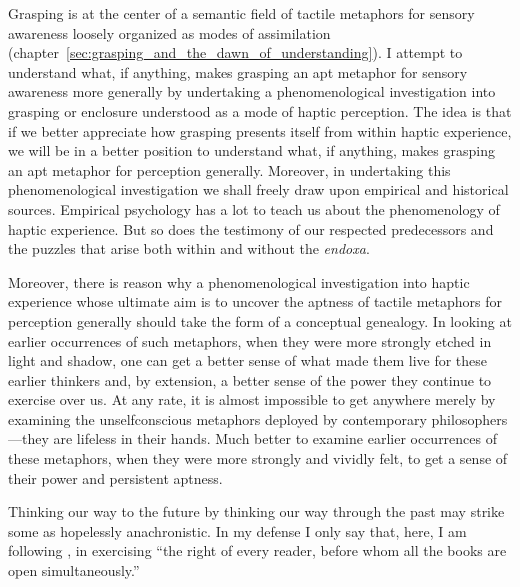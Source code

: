 Grasping is at the center of a semantic field of tactile metaphors for sensory awareness loosely organized as modes of assimilation (chapter~\ref{sec:grasping_and_the_dawn_of_understanding}). I attempt to understand what, if anything, makes grasping an apt metaphor for sensory awareness more generally by undertaking a phenomenological investigation into grasping or enclosure understood as a mode of haptic perception. The idea is that if we better appreciate how grasping presents itself from within haptic experience, we will be in a better position to understand what, if anything, makes grasping an apt metaphor for perception generally. Moreover, in undertaking this phenomenological investigation we shall freely draw upon empirical and historical sources. Empirical psychology has a lot to teach us about the phenomenology of haptic experience. But so does the testimony of our respected predecessors and the puzzles that arise both within and without the \emph{endoxa}.

Moreover, there is reason why a phenomenological investigation into haptic experience whose ultimate aim is to uncover the aptness of tactile metaphors for perception generally should take the form of a conceptual genealogy. In looking at earlier occurrences of such metaphors, when they were more strongly etched in light and shadow, one can get a better sense of what made them live for these earlier thinkers and, by extension, a better sense of the power they continue to exercise over us. At any rate, it is almost impossible to get anywhere merely by examining the unselfconscious metaphors deployed by contemporary philosophers---they are lifeless in their hands. Much better to examine earlier occurrences of these metaphors, when they were more strongly and vividly felt, to get a sense of their power and persistent aptness.

Thinking our way to the future by thinking our way through the past may strike some as hopelessly anachronistic. In my defense I only say that, here, I am following \citet[xvii]{Ricoeur:2004ax}, in exercising ``the right of every reader, before whom all the books are open simultaneously.''

